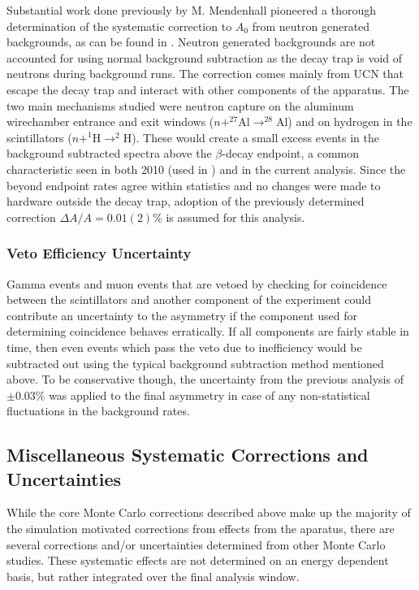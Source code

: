 Substantial work done previously by M. Mendenhall pioneered a thorough determination
of the systematic correction to $A_0$ from neutron generated backgrounds, as can be
found in \cite{mpmThesis}. Neutron generated backgrounds are not accounted for
using normal background subtraction as the decay trap is void of neutrons during background
runs. The correction comes mainly from UCN that escape the decay trap
and interact with other components of the apparatus. The two main mechanisms studied
were neutron capture on the aluminum wirechamber entrance and exit windows
($n+^{27}\mathrm{Al} \rightarrow ^{28}\mathrm{Al}$) and on hydrogen in
the scintillators ($n+^{1}\mathrm{H} \rightarrow ^{2}\mathrm{H}$). These would create a small
excess events in the
background subtracted spectra
above the $\beta$-decay endpoint, a common characteristic seen in both 2010 (used in
\cite{mpmThesis}) and in the current analysis. Since the
beyond endpoint rates agree within statistics and no changes were made to hardware outside
the decay trap, adoption of
the previously determined correction $\Delta A /A = 0.01(2)\%$ is assumed for this analysis.

\subsubsection{Veto Efficiency Uncertainty}

Gamma events and muon events that are vetoed by checking for coincidence between the scintillators and
another component of the experiment could contribute an uncertainty to the asymmetry if the component
used for determining coincidence behaves erratically. If all components are fairly stable in time,
then even events which pass the veto due to inefficiency would be subtracted out using the
typical background subtraction method mentioned above. To be conservative though, the uncertainty
from the previous analysis of $\pm 0.03\%$ was applied to the final asymmetry in case of
any non-statistical fluctuations in the background rates.


\subsection{Miscellaneous Systematic Corrections and Uncertainties}

While the core Monte Carlo corrections described above make up the majority of the
simulation motivated corrections from effects from the aparatus, there are several
corrections and/or uncertainties determined from other Monte Carlo studies. These
systematic effects are not determined on an energy dependent basis, but rather integrated
over the final analysis window.

